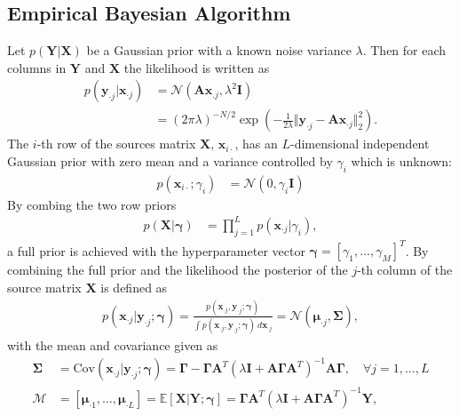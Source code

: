 \subsection{Empirical Bayesian Algorithm}
Let $p(\mathbf{Y} \vert \mathbf{X})$ be a Gaussian prior with a known noise variance $\lambda$. Then for each columns in $\mathbf{Y}$ and $\mathbf{X}$ the likelihood is written as
\begin{align*}
p(\mathbf{y}_{\cdot j} \vert \mathbf{x}_{\cdot j}) &= \mathcal{N}(\mathbf{Ax}_{.j}, \lambda^2 \mathbf{I}) \\
&= (2 \pi \lambda)^{-N/2} \exp \left( - \frac{1}{2 \lambda} \Vert \mathbf{y}_{\cdot j} - \mathbf{A} \mathbf{x}_{\cdot j} \Vert_2^2 \right).
\end{align*}
The $i$-th row of the sources matrix $\mathbf{X}$, $\mathbf{x}_{i \cdot}$, has an $L$-dimensional independent Gaussian prior with zero mean and a variance controlled by $\gamma_i$ which is unknown:
\begin{align*}
p (\mathbf{x}_{i \cdot} ; \gamma_i) &= \mathcal{N}(0, \gamma_i \mathbf{I})
\end{align*}
By combing the two row priors 
\begin{align*}
p (\mathbf{X} \vert \boldsymbol{\gamma}) &= \prod_{j=1}^L p (\mathbf{x}_{ \cdot j} \vert \gamma_i),
\end{align*}
a full prior is achieved with the hyperparameter vector $\boldsymbol{\gamma} = [\gamma_1, \dots, \gamma_M]^T$. By combining the full prior and the likelihood the posterior of the $j$-th column of the source matrix $\mathbf{X}$ is defined as
\begin{align*}
p(\mathbf{x}_{\cdot j} \vert \mathbf{y}_{\cdot j} ; \boldsymbol{\gamma}) = \frac{p(\mathbf{x}_{\cdot j}, \mathbf{y}_{\cdot j} ; \boldsymbol{\gamma})}{\int p(\mathbf{x}_{\cdot j}, \mathbf{y}_{\cdot j} ; \boldsymbol{\gamma}) \ d \mathbf{x}_{\cdot j}} = \mathcal{N}(\boldsymbol{\mu}_{\cdot j}, \boldsymbol{\Sigma}),
\end{align*}
with the mean and covariance given as
\begin{align}\label{eq:moments}
\boldsymbol{\Sigma} &= \text{Cov}(\mathbf{x}_{\cdot j} \vert \mathbf{y}_{\cdot j} ; \boldsymbol{\gamma}) = \boldsymbol{\Gamma} - \boldsymbol{\Gamma} \mathbf{A}^T \left( \lambda \mathbf{I} + \mathbf{A} \boldsymbol{\Gamma} \mathbf{A}^T\right)^{-1} \mathbf{A} \boldsymbol{\Gamma}, \quad \forall j = 1, \dots, L \\
\mathcal{M} &= [\boldsymbol{\mu}_{\cdot 1}, \dots, \boldsymbol{\mu}_{\cdot L}] = \mathbb{E}[\mathbf{X} \vert \mathbf{Y} ; \boldsymbol{\gamma}] = \boldsymbol{\Gamma} \mathbf{A}^T \left( \lambda \mathbf{I} + \mathbf{A} \boldsymbol{\Gamma} \mathbf{A}^T\right)^{-1} \mathbf{Y},
\end{align}
